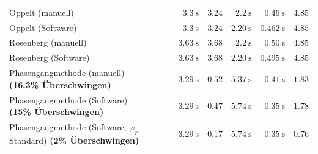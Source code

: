 \begin{longtable}{p{85mm}rrrrr}
    \addlinespace[0.5em]

    Oppelt (manuell)~\cite{ref:op_ros_zieg}
    &
    $\SI{3.3}{\second}$
    &
    $3.24$
    &
    $\SI{2.2}{\second}$
    &
    $\SI{0.46}{\second}$
    &
    $4.85$
    \\

    \addlinespace[0.5em]

    Oppelt (Software)
    &
    $\SI{3.3}{\second}$
    &
    $3.24$
    &
    $\SI{2.20}{\second}$
    &
    $\SI{0.462}{\second}$
    &
    $4.85$
    \\

    \addlinespace[0.5em]

    Rosenberg (manuell)~\cite{ref:op_ros_zieg}
    &
    $\SI{3.63}{\second}$
    &
    $3.68$
    &
    $\SI{2.2}{\second}$
    &
    $\SI{0.50}{\second}$
    &
    $4.85$
    \\

    \addlinespace[0.5em]

    Rosenberg (Software)
    &
    $\SI{3.63}{\second}$
    &
    $3.68$
    &
    $\SI{2.20}{\second}$
    &
    $\SI{0.495}{\second}$
    &
    $4.85$
    \\

    \addlinespace[0.5em]

    \pbox{84mm}{Phasengangmethode (manuell) \\ \small{\textbf{(16.3\% \"Uberschwingen)}} \\}
    &
    $\SI{3.29}{\second}$
    &
    $0.52$
    &
    $\SI{5.37}{\second}$
    &
    $\SI{0.41}{\second}$
    &
    $1.83$
    \\

    \addlinespace[0.5em]

    \pbox{84mm}{Phasengangmethode (Software) \\ \small{\textbf{(15\% \"Uberschwingen)}} \\}
    &
    $\SI{3.29}{\second}$
    &
    $0.47$
    &
    $\SI{5.74}{\second}$
    &
    $\SI{0.35}{\second}$
    &
    $1.78$
    \\

    \addlinespace[0.5em]

    \pbox{84mm}{Phasengangmethode (Software, $\varphi_r$ Standard) \\ \small{\textbf{(2\% \"Uberschwingen)}} \\}
    &
    $\SI{3.29}{\second}$
    &
    $0.17$
    &
    $\SI{5.74}{\second}$
    &
    $\SI{0.35}{\second}$
    &
    $0.76$
    \\


\end{longtable}
